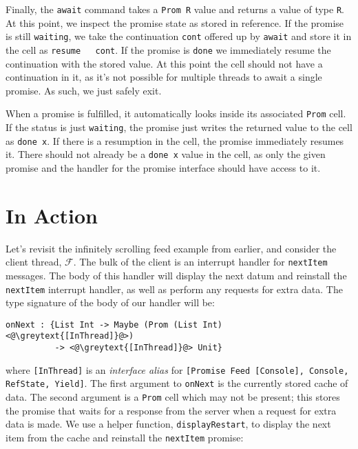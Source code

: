 \documentclass[msc,deptreport,cs]{infthesis} %
\newcommand{\code}[1]{\lstinline{#1}}
\newcommand{\greytext}[1]{\textcolor{black!40}{#1}}
\newcommand\feed{$\mathcal{F}$}
\begin{document}
Finally, the \code{await} command takes a \code{Prom R} value and returns a
value of type \code{R}. At this point, we inspect the promise state as stored in
reference. If the promise is still \code{waiting}, we take the continuation
\code{cont} offered up by \code{await} and store it in the cell as \code{resume
  cont}. If the promise is \code{done} we immediately resume the continuation
with the stored value. At this point the cell should not have a continuation in
it, as it's not possible for multiple threads to await a single promise. As
such, we just safely exit.

When a promise is fulfilled, it automatically looks inside its associated
\code{Prom} cell. If the status is just \code{waiting}, the promise just writes
the returned value to the cell as \code{done x}. If there is a resumption in the
cell, the promise immediately resumes it. There should not already be a
\code{done x} value in the cell, as only the given promise and the handler for
the promise interface should have access to it.

\section{In Action}

Let's revisit the infinitely scrolling feed example from earlier, and consider
the client thread, \feed. The bulk of the client is an interrupt handler for
\code{nextItem} messages. The body of this handler will display the next datum
and reinstall the \code{nextItem} interrupt handler, as well as perform any
requests for extra data. The type signature of the body of our handler will be:

\begin{lstlisting}
onNext : {List Int -> Maybe (Prom (List Int) <@\greytext{[InThread]}@>)
          -> <@\greytext{[InThread]}@> Unit}
\end{lstlisting}

\noindent where \code{[InThread]} is an \emph{interface alias} for
\code{[Promise Feed [Console], Console, RefState, Yield]}. The first argument to
\code{onNext} is the currently stored cache of data. The second argument is a
\code{Prom} cell which may not be present; this stores the promise that waits
for a response from the server when a request for extra data is made.
%
We use a helper function, \code{displayRestart}, to display the next item from the cache and reinstall the \code{nextItem} promise:
\end{document}
